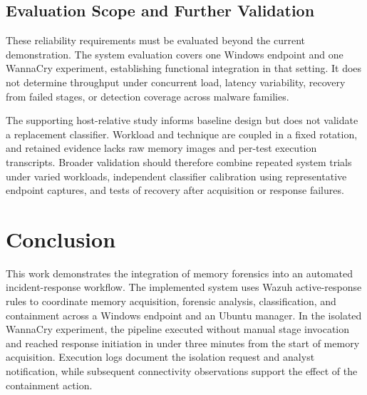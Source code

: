 \documentclass[conference]{IEEEtran}
\begin{document}
\subsection{Evaluation Scope and Further Validation}
These reliability requirements must be evaluated beyond the current demonstration. The system evaluation covers one Windows endpoint and one WannaCry experiment, establishing functional integration in that setting. It does not determine throughput under concurrent load, latency variability, recovery from failed stages, or detection coverage across malware families.

The supporting host-relative study informs baseline design but does not validate a replacement classifier. Workload and technique are coupled in a fixed rotation, and retained evidence lacks raw memory images and per-test execution transcripts. Broader validation should therefore combine repeated system trials under varied workloads, independent classifier calibration using representative endpoint captures, and tests of recovery after acquisition or response failures.


\newpage
\section{Conclusion}

This work demonstrates the integration of memory forensics into an automated incident-response workflow. The implemented system uses Wazuh active-response rules to coordinate memory acquisition, forensic analysis, classification, and containment across a Windows endpoint and an Ubuntu manager. In the isolated WannaCry experiment, the pipeline executed without manual stage invocation and reached response initiation in under three minutes from the start of memory acquisition. Execution logs document the isolation request and analyst notification, while subsequent connectivity observations support the effect of the containment action.
\end{document}

